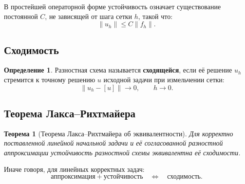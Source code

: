 \documentclass[12pt,a4paper]{article}
\theoremstyle{definition}
\newtheorem{definition}{Определение}
\theoremstyle{plain}
\newtheorem{theorem}{Теорема}
\begin{document}
В простейшей операторной форме устойчивость означает существование постоянной $C$, не зависящей от шага сетки $h$, такой что:
\[
\|u_h\| \le C \|f_h\|.
\]

\subsection{Сходимость}

\begin{definition}
Разностная схема называется \textbf{сходящейся}, если её решение $u_h$ стремится к точному решению $u$ исходной задачи при измельчении сетки:
\[
\|u_h - [u]\| \to 0,
\qquad h\to 0.
\]
\end{definition}

\subsection{Теорема Лакса--Рихтмайера}

\begin{theorem}[Теорема Лакса--Рихтмайера об эквивалентности]
Для корректно поставленной линейной начальной задачи и её согласованной разностной аппроксимации устойчивость разностной схемы эквивалентна её сходимости.
\end{theorem}

Иначе говоря, для линейных корректных задач:
\[
\text{аппроксимация} + \text{устойчивость}
\quad \Longleftrightarrow \quad
\text{сходимость}.
\]
\end{document}
